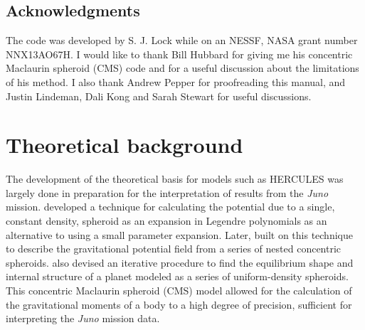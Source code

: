 \documentclass[11pt, oneside]{article}   	%
\begin{document}

\subsection{Acknowledgments}

The code was developed by S. J. Lock while on an NESSF, NASA grant number NNX13AO67H.
I would like to thank Bill Hubbard for giving me his concentric Maclaurin spheroid (CMS) code \citep{Hubbard2013} and for a useful discussion about the limitations of his method.
I also thank Andrew Pepper for proofreading this manual, and Justin Lindeman, Dali Kong and Sarah Stewart for useful discussions. 

\section{Theoretical background}
\label{HUG:sec:theory}

The development of the theoretical basis for models such as HERCULES was largely done in preparation for the interpretation of results from the {\it Juno} mission. 
\cite{Hubbard2012} developed a technique for calculating the potential due to a single, constant density, spheroid as an expansion in Legendre polynomials as an alternative to using a small parameter expansion.
Later, \cite{Hubbard2013} built on this technique to describe the gravitational potential field from a series of nested concentric spheroids.
\cite{Hubbard2013} also devised an iterative procedure to find the equilibrium shape and internal structure of a planet modeled as a series of uniform-density spheroids.
This concentric Maclaurin spheroid (CMS) model allowed for the calculation of the gravitational moments of a body to a high degree of precision, sufficient for interpreting the {\it Juno} mission data.
\end{document}
